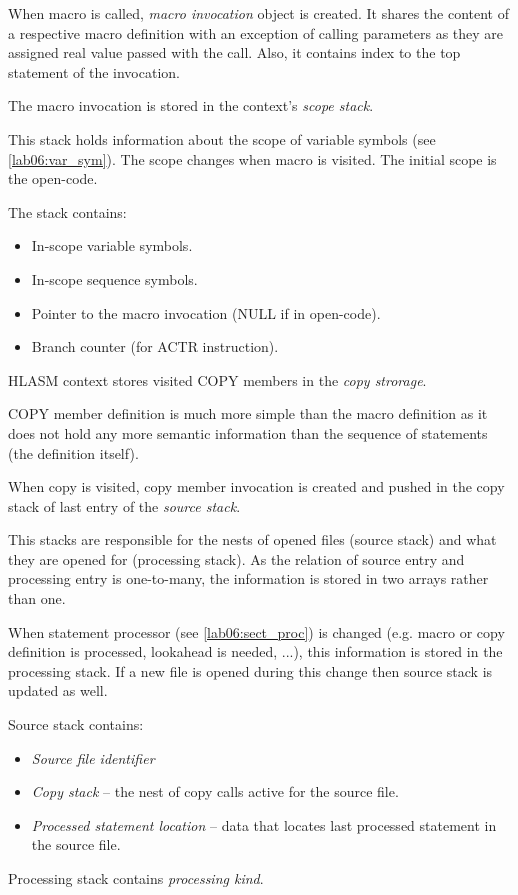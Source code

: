 When macro is called, \emph{macro invocation} object is created. It shares the content of a respective macro definition with an exception of calling parameters as they are assigned real value passed with the call. Also, it contains index to the top statement of the invocation.

The macro invocation is stored in the context's \emph{scope stack}.

This stack holds information about the scope of variable symbols (see \cref{lab06:var_sym}). The scope changes when macro is visited. The initial scope is the open-code. 


The stack contains:
\begin{itemize}
	\item In-scope variable symbols.
	\item In-scope sequence symbols.
	\item Pointer to the macro invocation (NULL if in open-code).
	\item Branch counter (for ACTR instruction).
\end{itemize}

HLASM context stores visited COPY members in the \emph{copy strorage}.

COPY member definition is much more simple than the macro definition as it does not hold any more semantic information than the sequence of statements (the definition itself).

When copy is visited, copy member invocation is created and pushed in the copy stack of last entry of the \emph{source stack}.

This stacks are responsible for the nests of opened files (source stack) and what they are opened for (processing stack). As the relation of source entry and processing entry is one-to-many, the information is stored in two arrays rather than one.

When statement processor (see \cref{lab06:sect_proc}) is changed (e.g. macro or copy definition is processed, lookahead is needed, ...), this information is stored in the processing stack. If a new file is opened during this change then source stack is updated as well.

Source stack contains:
\begin{itemize}
	\item \emph{Source file identifier}
	\item \emph{Copy stack} -- the nest of copy calls active for the source file.
	\item \emph{Processed statement location} -- data that locates last processed statement in the source file.
\end{itemize}
Processing stack contains \emph{processing kind}.

